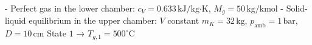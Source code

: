 - Perfect gas in the lower chamber: \( c_V = 0.633 \, \text{kJ/kg·K} \), \( M_g = 50 \, \text{kg/kmol} \)  
- Solid-liquid equilibrium in the upper chamber: \( V \) constant  
\( m_K = 32 \, \text{kg} \), \( p_{\text{amb}} = 1 \, \text{bar} \), \( D = 10 \, \text{cm} \)  
State \( 1 \) → \( T_{g,1} = 500^\circ \text{C} \)